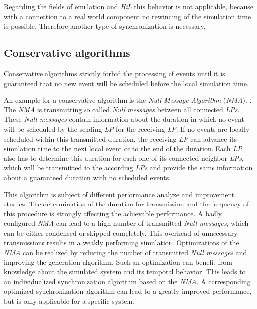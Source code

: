 Regarding the fields of emulation and \emph{HiL} this behavior is not applicable, because with a connection to a real world component no rewinding of the simulation time is possible.
Therefore another type of synchronization is necessary.
    
\subsection{Conservative algorithms}
\label{sec:parallel_synchronization_conservative}
Conservative algorithms strictly forbid the processing of events until it is guaranteed that no new event will be scheduled before the local simulation time.

An example for a conservative algorithm is the \emph{Null Message Algorithm} (\emph{NMA}). \cite[section 2.1]{bagrodia_performance_2000}.
The \emph{NMA} is transmitting so called \emph{Null messages} between all connected \emph{LPs}.
These \emph{Null messages} contain information about the duration in which no event will be scheduled by the sending \emph{LP} for the receiving \emph{LP}.
If no events are locally scheduled within this transmitted duration, the receiving \emph{LP} can advance its simulation time to the next local event or to the end of the duration.
Each \emph{LP} also has to determine this duration for each one of its connected neighbor \emph{LPs}, which will be transmitted to the according \emph{LPs} and provide the same information about a guaranteed duration with no scheduled events.\cite[section 3]{kumar_study_1993}

This algorithm is subject of different performance analyze and improvement studies. \cite{kumar_study_1993} \cite{rizvi_reducing_2008} \cite{Varga03apractical}
The determination of the duration for transmission and the frequency of this procedure is strongly affecting the achievable performance.
A badly configured \emph{NMA} can lead to a high number of transmitted \emph{Null messages}, which can be either condensed or skipped completely.
This overhead of unnecessary transmissions results in a weakly performing simulation.
Optimizations of the \emph{NMA} can be realized by reducing the number of transmitted \emph{Null messages} and improving the generation algorithm. \cite{de_vries_reducing_1990}
Such an optimization can benefit from knowledge about the simulated system and its temporal behavior.
This leads to an individualized synchronization algorithm based on the \emph{NMA}.
A corresponding optimized synchronization algorithm can lead to a greatly improved performance, but is only applicable for a specific system.
\\

